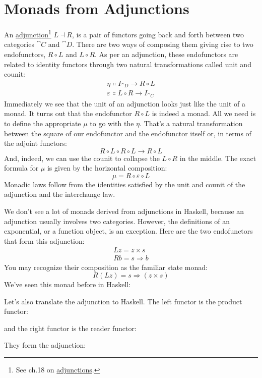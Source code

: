 \section{Monads from Adjunctions}

An \hyperref[adjunctions]{adjunction}\footnote{See ch.18 on \hyperref[adjunctions]{adjunctions}.}
$L \dashv R$, is a pair of functors going back and forth between two
categories $\cat{C}$ and $\cat{D}$. There are two ways of composing them
giving rise to two endofunctors, $R \circ L$ and $L \circ R$.
As per an adjunction, these endofunctors are related to identity
functors through two natural transformations called unit and counit:
\begin{gather*}
	\eta \Colon I_{\cat{D}} \to R \circ L \\
	\varepsilon \Colon L \circ R \to I_{\cat{C}}
\end{gather*}
Immediately we see that the unit of an adjunction looks just like the
unit of a monad. It turns out that the endofunctor $R \circ L$ is
indeed a monad. All we need is to define the appropriate $\mu$ to go with
the $\eta$. That's a natural transformation between the square of our
endofunctor and the endofunctor itself or, in terms of the adjoint
functors:
\[R \circ L \circ R \circ L \to R \circ L\]
And, indeed, we can use the counit to collapse the $L \circ R$ in
the middle. The exact formula for $\mu$ is given by the horizontal
composition:
\[\mu = R \circ \varepsilon \circ L\]
Monadic laws follow from the identities satisfied by the unit and counit
of the adjunction and the interchange law.

We don't see a lot of monads derived from adjunctions in Haskell,
because an adjunction usually involves two categories. However, the
definitions of an exponential, or a function object, is an exception.
Here are the two endofunctors that form this adjunction:
\begin{gather*}
	L z = z\times{}s \\
	R b = s \Rightarrow b
\end{gather*}
You may recognize their composition as the familiar state monad:
\[R (L z) = s \Rightarrow (z\times{}s)\]
We've seen this monad before in Haskell:

Let's also translate the adjunction to Haskell. The left functor is the
product functor:

and the right functor is the reader functor:

They form the adjunction:

